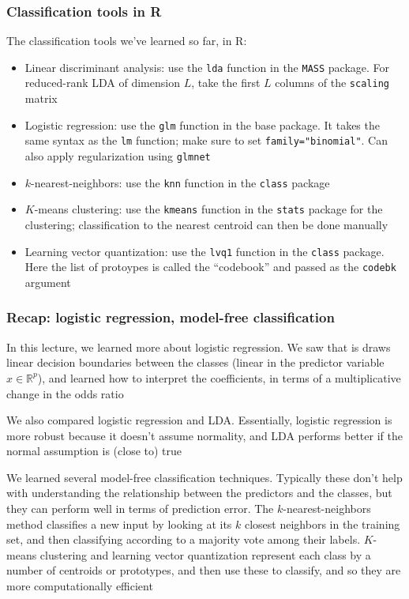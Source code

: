 \documentclass[mathserif]{beamer}
\def\R{\mathds{R}}
\def\red{\color[rgb]{0.8,0,0}}
\begin{document}
\begin{frame}
\frametitle{Classification tools in R}
\smallskip\smallskip
The classification tools we've learned so far, in R:

\smallskip
\begin{itemize}
\item Linear discriminant analysis: use the {\tt lda} function
in the {\tt MASS} package. For reduced-rank LDA of dimension $L$,
take the first $L$ columns of the {\tt scaling} matrix

\smallskip
\item Logistic regression: use the {\tt glm} function in the base package. 
It takes the same syntax as the {\tt lm} function; make sure to set
{\tt family="binomial"}. Can also apply regularization using {\tt glmnet}

\smallskip
\item $k$-nearest-neighbors: use the {\tt knn} function in the 
{\tt class} package

\smallskip
\item $K$-means clustering: use the {\tt kmeans} function in the
{\tt stats} package for the clustering; classification to the nearest
centroid can then be done manually

\smallskip
\item Learning vector quantization: use the {\tt lvq1} function in
the {\tt class} package. Here the list of protoypes is called the 
``codebook'' and passed as the {\tt codebk} argument
\end{itemize}
\end{frame}

\begin{frame}
\frametitle{Recap: logistic regression, model-free classification}
\smallskip
In this lecture, we learned more about {\red logistic regression}.
We saw that is draws linear decision boundaries between the classes
(linear in the predictor variable $x \in \R^p$), and learned how
to interpret the coefficients, in terms of a multiplicative change
in the odds ratio

\bigskip
We also {\red compared} logistic regression and LDA. Essentially,
logistic regression is more robust because it doesn't assume normality,
and LDA performs better if the normal assumption is (close to) true

\bigskip
We learned several {\red model-free} classification techniques. 
Typically these don't help with understanding the relationship between
the predictors and the classes, but they can perform well in terms of 
prediction error. 
The {\red $k$-nearest-neighbors} method classifies a new input by looking at 
its $k$ closest neighbors in the training set, and then classifying 
according to a majority vote among their labels. {\red $K$-means
clustering} and {\red learning vector quantization} represent each class 
by a number of centroids or prototypes, and then use these to classify, 
and so they are more computationally efficient
\end{frame}
\end{document}
